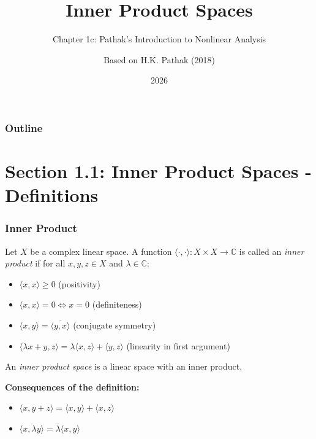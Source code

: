 \documentclass[aspectratio=169,10pt]{beamer}
\title{Inner Product Spaces}
\subtitle{Chapter 1c: Pathak's Introduction to Nonlinear Analysis}
\author{Based on H.K. Pathak (2018)}
\date{2026}
\begin{document}
\frame{\titlepage}

\begin{frame}
\frametitle{Outline}
\tableofcontents[hideallsubsections]
\end{frame}

\section{Section 1.1: Inner Product Spaces - Definitions}

\begin{frame}
\frametitle{Inner Product}

\begin{definition}
Let $X$ be a complex linear space. A function $\langle \cdot, \cdot \rangle: X \times X \to \mathbb{C}$ is called an \emph{inner product} if for all $x, y, z \in X$ and $\lambda \in \mathbb{C}$:
\begin{itemize}
\item[\textbf{IP1}] $\langle x, x \rangle \geq 0$ (positivity)
\item[\textbf{IP2}] $\langle x, x \rangle = 0 \iff x = 0$ (definiteness)
\item[\textbf{IP3}] $\langle x, y \rangle = \overline{\langle y, x \rangle}$ (conjugate symmetry)
\item[\textbf{IP4}] $\langle \lambda x + y, z \rangle = \lambda \langle x, z \rangle + \langle y, z \rangle$ (linearity in first argument)
\end{itemize}
\end{definition}

\vspace{0.2cm}

An \emph{inner product space} is a linear space with an inner product.

\vspace{0.3cm}

\textbf{Consequences of the definition:}
\begin{itemize}
\item $\langle x, y + z \rangle = \langle x, y \rangle + \langle x, z \rangle$
\item $\langle x, \lambda y \rangle = \overline{\lambda} \langle x, y \rangle$
\end{itemize}
\end{frame}
\end{document}
